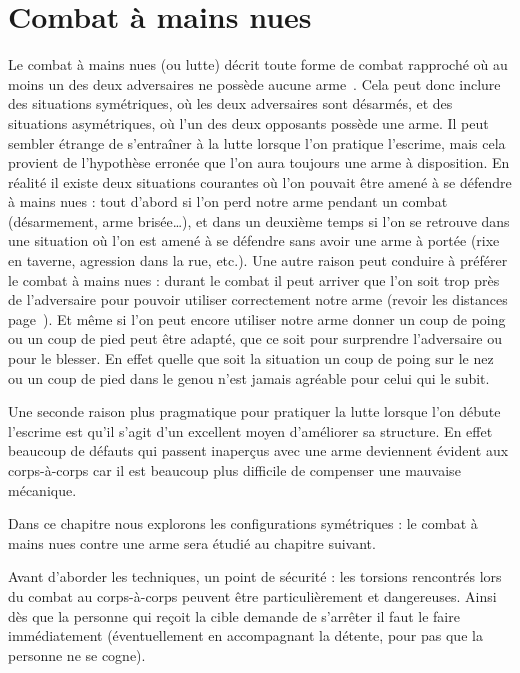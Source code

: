 \chapter{Combat à mains nues}


Le combat à mains nues (ou lutte) décrit toute forme de combat rapproché où au moins un des deux adversaires ne possède aucune arme~\footnotemark{}.%
Cela peut donc inclure des situations symétriques, où les deux adversaires sont désarmés, et des situations asymétriques, où l'un des deux opposants possède une arme.
Il peut sembler étrange de s'entraîner à la lutte lorsque l'on pratique l'escrime, mais cela provient de l'hypothèse erronée que l'on aura toujours une arme à disposition.
En réalité il existe deux situations courantes où l'on pouvait être amené à se défendre à mains nues : tout d'abord si l'on perd notre arme pendant un combat (désarmement, arme brisée…), et dans un deuxième temps si l'on se retrouve dans une situation où l'on est amené à se défendre sans avoir une arme à portée (rixe en taverne, agression dans la rue, etc.).
Une autre raison peut conduire à préférer le combat à mains nues : durant le combat il peut arriver que l'on soit trop près de l'adversaire pour pouvoir utiliser correctement notre arme (revoir les distances page~\pageref{conc:def:distances}).
Et même si l'on peut encore utiliser notre arme donner un coup de poing ou un coup de pied peut être adapté, que ce soit pour surprendre l'adversaire ou pour le blesser.
En effet quelle que soit la situation un coup de poing sur le nez ou un coup de pied dans le genou n'est jamais agréable pour celui qui le subit.

Une seconde raison plus pragmatique pour pratiquer la lutte lorsque l'on débute l'escrime est qu'il s'agit d'un excellent moyen d'améliorer sa structure.
En effet beaucoup de défauts qui passent inaperçus avec une arme deviennent évident aux corps-à-corps car il est beaucoup plus difficile de compenser une mauvaise mécanique.

Dans ce chapitre nous explorons les configurations symétriques : le combat à mains nues contre une arme sera étudié au chapitre suivant.

Avant d'aborder les techniques, un point de sécurité : les torsions rencontrés lors du combat au corps-à-corps peuvent être particulièrement et dangereuses.
Ainsi dès que la personne qui reçoit la cible demande de s'arrêter il faut le faire immédiatement (éventuellement en accompagnant la détente, pour pas que la personne ne se cogne).

